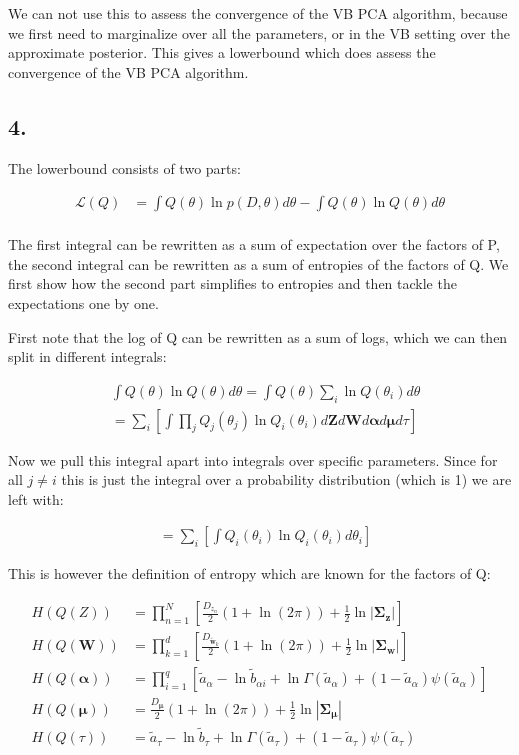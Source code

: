 \documentclass{article}
\def\*#1{\boldsymbol{#1}}
\begin{document}
We can not use this to assess the convergence of the VB PCA algorithm, because we first need to marginalize over all the parameters, or in the VB setting over the approximate posterior. This gives a lowerbound which does assess the convergence of the VB PCA algorithm.

\subsection*{4.}

The lowerbound consists of two parts:

\begin{align*}
\mathcal{L}(Q) &= \int Q(\theta) \ln p(D, \theta) d\theta - \int Q(\theta) \ln Q(\theta) d\theta \\
\end{align*}

The first integral can be rewritten as a sum of expectation over the factors of P, the second integral can be rewritten as a sum of entropies of the factors of Q. We first show how the second part simplifies to entropies and then tackle the expectations one by one.

First note that the log of Q can be rewritten as a sum of logs, which we can then split in different integrals:

\begin{align*}
& \int Q(\theta) \ln Q(\theta) d\theta = \int Q(\theta) \sum_i \ln Q(\theta_i) d\theta\\
&= \sum_i \left[ \int \prod_j Q_j(\theta_j) \ln Q_i(\theta_i) d\*Z d\*W d\*\alpha d\*\mu d\tau \right]
\end{align*}

Now we pull this integral apart into integrals over specific parameters. Since for all $j \neq i$ this is just the integral over a probability distribution (which is 1) we are left with:

\begin{align*}
&= \sum_i \left[ \int Q_i(\theta_i) \ln Q_i(\theta_i) d\theta_i \right]
\end{align*}

This is however the definition of entropy which are known for the factors of Q:

\begin{align*}
H(Q(Z)) &= \prod_{n=1}^N \left [\frac{D_{z_n}}{2}  (1 + \ln (2\pi)) + \frac{1}{2} \ln |\*\Sigma_{\*z} | \right ] \\
H(Q(\*W)) &= \prod_{k=1}^d \left [ \frac{D_{\tilde{\*w}_k} }{2} (1 + \ln (2\pi)) + \frac{1}{2} \ln |\*\Sigma_{\*w} | \right ] \\
H(Q(\*\alpha)) &= \prod_{i = 1}^q \left [ \tilde{a}_\alpha - \ln \tilde{b}_{\alpha i} + \ln \Gamma(\tilde{a}_\alpha) + (1 - \tilde{a}_\alpha)\psi(\tilde{a}_\alpha) \right ]\\
H(Q(\*\mu)) &= \frac{D_{\*\mu}}{2}  (1 + \ln (2\pi)) + \frac{1}{2} \ln |\*\Sigma_{\*\mu} | \\
H(Q(\tau)) &= \tilde{a}_\tau - \ln \tilde{b}_{\tau} + \ln \Gamma(\tilde{a}_\tau) + (1 - \tilde{a}_\tau)\psi(\tilde{a}_\tau)
\end{align*}
\end{document}
